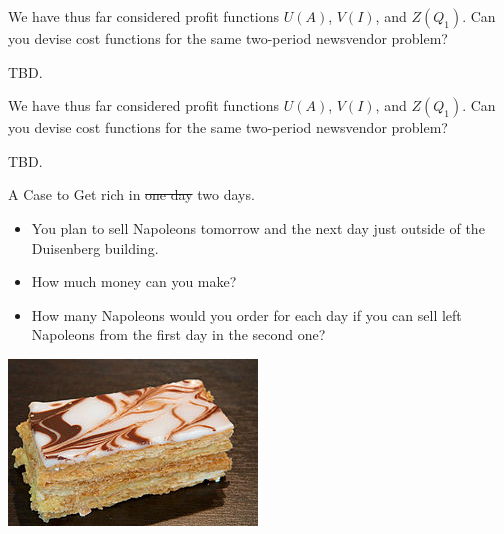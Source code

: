 \begin{question}
We have thus far considered profit functions $U(A)$, $V(I)$, and $Z(Q_1)$. Can you devise cost functions for the same two-period newsvendor problem?
   \begin{solution}
     TBD.
   \end{solution}
\end{question}

\begin{question}
We have thus far considered profit functions $U(A)$, $V(I)$, and $Z(Q_1)$. Can you devise cost functions for the same two-period newsvendor problem?
   \begin{solution}
     TBD.
   \end{solution}
\end{question}

\begin{question} A Case to  Get rich in \st{one day} two days. 

  \begin{itemize}
  \item You plan to sell Napoleons tomorrow and the next day just outside of the Duisenberg building.
  \item How much money can you make? 
  \item How many Napoleons would you order for each day if you can sell left Napoleons from the first day in the second one?
  \end{itemize}

   \includegraphics[scale = 1.0]{figures/mille-feuille}


\end{question}
